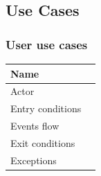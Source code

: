 \documentclass{article}
\begin{document}
\subsection{Use Cases}
\subsubsection{User use cases}
\begin{table}[H]
    \begin{tabular}{|l|l|}
    \hline
    Name & \begin{minipage}[t]{0.7\textwidth}\textbf{} \end{minipage} \\ \hline  
    Actor & \begin{minipage}[t]{0.7\textwidth} \end{minipage} \\ \hline 
    Entry conditions & \begin{minipage}[t]{0.7\textwidth} \end{minipage} \\
    \hline 
    Events flow & \begin{minipage}[t]{0.7\textwidth} \end{minipage} \\ \hline
    Exit conditions & \begin{minipage}[t]{0.7\textwidth} \end{minipage} \\
    \hline
    Exceptions & \begin{minipage}[t]{0.7\textwidth} \end{minipage} \\ \hline
    \end{tabular}
\end{table}
\end{document}
